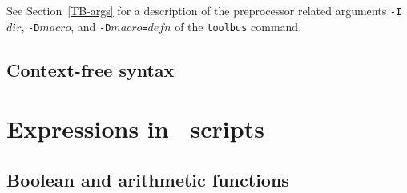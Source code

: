 See Section~\ref{TB-args} for a description
of the preprocessor related arguments {\tt -I$dir$}, {\tt -D$macro$}, and
{\tt -D$macro$=$defn$} of the {\tt toolbus} command.

\subsection{Context-free syntax}

  
\newpage
\section{\label{AppExpr}Expressions in \T\ scripts}

\subsection{Boolean and arithmetic functions}

